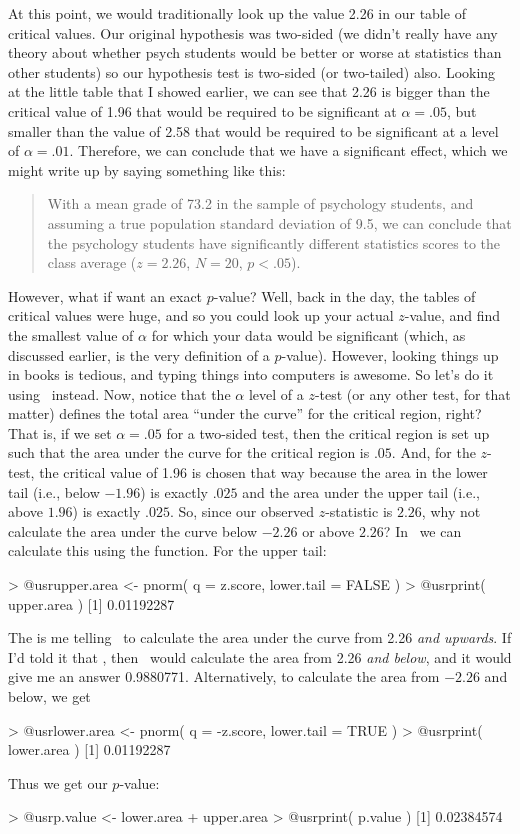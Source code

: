 At this point, we would traditionally look up the value 2.26 in our table of critical values. Our original hypothesis was two-sided (we didn't really have any theory about whether psych students would be better or worse at statistics than other students) so our hypothesis test is two-sided (or two-tailed) also. Looking at the little table that I showed earlier, we can see that 2.26 is bigger than the critical value of 1.96 that would be required to be significant at $\alpha = .05$, but smaller than the value of 2.58 that would be required to be significant at a level of $\alpha = .01$. Therefore, we can conclude that we have a significant effect, which we might write up by saying something like this:
\begin{quote}
With a mean grade of 73.2 in the sample of psychology students, and assuming a true population standard deviation of 9.5, we can conclude that the psychology students have significantly different statistics scores to the class average ($z = 2.26$, $N=20$, $p<.05$). 
\end{quote}
However, what if want an exact $p$-value? Well, back in the day, the tables of critical values were huge, and so you could look up your actual $z$-value, and find the smallest value of $\alpha$ for which your data would be significant (which, as discussed earlier, is the very definition of a $p$-value). However, looking things up in books is tedious, and typing things into computers is awesome. So let's do it using \R\ instead. Now, notice that the $\alpha$ level of a $z$-test (or any other test, for that matter) defines the total area ``under the curve'' for the critical region, right? That is, if we set $\alpha = .05$ for a two-sided test, then the critical region is set up such that the area under the curve for the critical region is $.05$. And, for the $z$-test, the critical value of 1.96 is chosen that way because the area in the lower tail (i.e., below $-1.96$) is exactly $.025$ and the area under the upper tail (i.e., above $1.96$) is exactly $.025$. So, since our observed $z$-statistic is $2.26$, why not calculate the area under the curve below $-2.26$ or above $2.26$? In \R\ we can calculate this using the  function. For the upper tail:
\begin{rblock1}
> @usr{upper.area <- pnorm( q = z.score, lower.tail = FALSE )}
> @usr{print( upper.area )}
[1] 0.01192287
\end{rblock1} 
The   is me telling \R\ to calculate the area under the curve from 2.26 {\it and upwards}. If I'd told it that , then \R\ would calculate the area from 2.26 {\it and below}, and it would give me an answer 0.9880771. Alternatively, to calculate the area from $-2.26$ and below, we get
\begin{rblock1}
> @usr{lower.area <- pnorm( q = -z.score, lower.tail = TRUE )}
> @usr{print( lower.area )}
[1] 0.01192287
\end{rblock1} 
Thus we get our $p$-value:
\begin{rblock1}
> @usr{p.value <- lower.area + upper.area}
> @usr{print( p.value )}
[1] 0.02384574
\end{rblock1}

